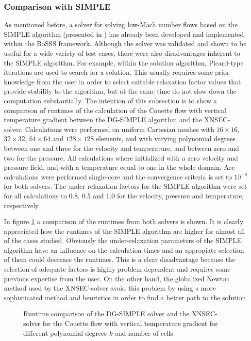 \subsubsection{Comparison with SIMPLE}
As mentioned before, a solver for solving low-Mach number flows based on the SIMPLE algorithm (presented in \cite{kleinHighorderDiscontinuousGalerkin2016}) has already been developed and implemented within the BoSSS framework.
Although the solver was validated and shown to be useful for a wide variety of test cases, there were also disadvantages inherent to the SIMPLE algorithm. For example,
within the solution algorithm, Picard-type iterations are used to search for a solution. This usually requires some prior knowledge from the user in order to select suitable relaxation factor values that provide stability to the algorithm, but at the same time do not slow down the computation substantially. 
The intention of this subsection is to show a comparison of runtimes of the calculation of the Couette flow with vertical temperature gradient between the DG-SIMPLE algorithm \citep{kleinHighorderDiscontinuousGalerkin2016} and the XNSEC-solver. Calculations were performed on uniform Cartesian meshes with $16\times16$, $32\times32$, $64\times64$ and $128\times128$ elements, and with varying polynomial degrees between one and three for the velocity and temperature, and between zero and two for the pressure. All calculations where initialized with a zero velocity and pressure field, and with a temperature equal to one in the whole domain. Are calculations were performed single-core and the convergence criteria is set to $10^{-8}$ for both solvers. The under-relaxation factors for the SIMPLE algorithm were set for all calculations to 0.8, 0.5 and 1.0 for the velocity, pressure and temperature, respectively.

In figure \cref{fig:RuntimeComparison} a comparison of the runtimes from both solvers is shown. It is clearly  appreciated how the runtimes of the SIMPLE algorithm are higher for almost all of the cases studied. Obviously the under-relaxation parameters of the SIMPLE algorithm have an influence on the calculation times and an appropiate selection of them could decrease the runtimes. This is a clear disadvantage because the selection of adequate factors is highly problem dependent and requires some previous expertise from the user. On the other hand, the globalized Newton method used by the XNSEC-solver avoid this problem by using a more sophisticated method and heuristics in order to find a better path to the solution.




\begin{figure}	
\centering
	\caption{Runtime comparison of the DG-SIMPLE solver and the XNSEC-solver for the Couette flow with vertical temperature gradient for different polynomial degrees $k$ and number of cells.}
	\label{fig:RuntimeComparison}
\end{figure}



